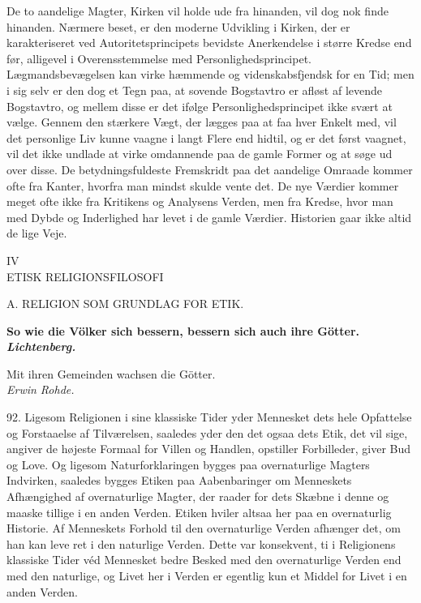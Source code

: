 \documentclass[12pt,a4paper,openany]{book}
\newcommand{\opage}[1]{\marginnote{\footnotesize\textit{[#1]}}}
\begin{document}
De to aandelige Magter, Kirken vil holde ude fra hinanden, vil dog nok
finde hinanden. Nærmere beset, er den moderne Udvikling i Kirken, der er
karakteriseret ved Autoritetsprincipets bevidste Anerkendelse i større
Kredse end før, alligevel i Overensstemmelse med Personlighedsprincipet.
Lægmandsbevægelsen kan virke hæmmende og videnskabsfjendsk for en Tid;
men i sig selv er den dog et Tegn paa, at sovende Bogstavtro er afløst
af levende Bogstavtro, og mellem disse er det ifølge
Personlighedsprincipet ikke svært at vælge. Gennem den stærkere Vægt,
der lægges paa at faa hver Enkelt med, vil det personlige Liv kunne
vaagne i langt Flere end hidtil, og er det først vaagnet, vil det ikke
undlade at virke omdannende paa de gamle Former og at søge ud over
disse. De betydningsfuldeste Fremskridt paa det aandelige Omraade kommer
ofte fra Kanter, hvorfra man mindst skulde vente det. De nye Værdier
kommer meget ofte ikke fra Kritikens og Analysens Verden, men fra
Kredse, hvor man med Dybde og Inderlighed har levet i de gamle Værdier.
Historien gaar ikke altid de lige Veje.

\clearpage

\opage{209}\begin{center}IV\\[6pt]ETISK RELIGIONSFILOSOFI\end{center}
\clearpage
\opage{210}\mbox{}\clearpage

\opage{211}\begin{center}A. RELIGION SOM GRUNDLAG FOR ETIK.\end{center}

\begin{flushright}\begin{minipage}{0.55\textwidth}\small\bfseries
So wie die Völker sich bessern, bessern sich auch ihre Götter.\\
\hfill\textit{Lichtenberg.}\par\smallskip
Mit ihren Gemeinden wachsen die Götter.\\
\hfill\textit{Erwin Rohde.}
\end{minipage}\end{flushright}

92. Ligesom Religionen i sine klassiske Tider yder Mennesket dets hele
Opfattelse og Forstaaelse af Tilværelsen, saaledes yder den det ogsaa
dets Etik, det vil sige, angiver de højeste Formaal for Villen og
Handlen, opstiller Forbilleder, giver Bud og Love. Og ligesom
Naturforklaringen bygges paa overnaturlige Magters Indvirken, saaledes
bygges Etiken paa Aabenbaringer om Menneskets Afhængighed af
overnaturlige Magter, der raader for dets Skæbne i denne og maaske
tillige i en anden Verden. Etiken hviler altsaa her paa en overnaturlig
Historie. Af Menneskets Forhold til den overnaturlige Verden afhænger
det, om han kan leve ret i den naturlige Verden. Dette var konsekvent,
ti i Religionens klassiske Tider véd Mennesket bedre Besked med den
overnaturlige Verden end med den naturlige, og Livet her i Verden er
egentlig kun et Middel for Livet i en anden Verden.
\end{document}
